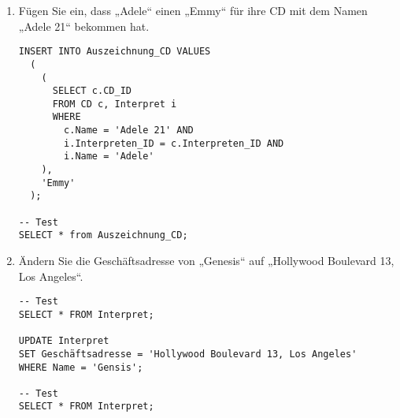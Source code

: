 \documentclass{lehramt-informatik-aufgabe}
\begin{document}
\begin{enumerate}

\item Fügen Sie ein, dass „Adele“ einen „Emmy“ für ihre CD mit dem Namen
„Adele 21“ bekommen hat.

\begin{antwort}
\begin{verbatim}
INSERT INTO Auszeichnung_CD VALUES
  (
    (
      SELECT c.CD_ID
      FROM CD c, Interpret i
      WHERE
        c.Name = 'Adele 21' AND
        i.Interpreten_ID = c.Interpreten_ID AND
        i.Name = 'Adele'
    ),
    'Emmy'
  );

-- Test
SELECT * from Auszeichnung_CD;
\end{verbatim}
\end{antwort}


\item Ändern Sie die Geschäftsadresse von „Genesis“ auf „Hollywood
Boulevard 13, Los Angeles“.

\begin{antwort}
\begin{verbatim}
-- Test
SELECT * FROM Interpret;

UPDATE Interpret
SET Geschäftsadresse = 'Hollywood Boulevard 13, Los Angeles'
WHERE Name = 'Gensis';

-- Test
SELECT * FROM Interpret;
\end{verbatim}
\end{antwort}

\end{enumerate}
\end{document}
